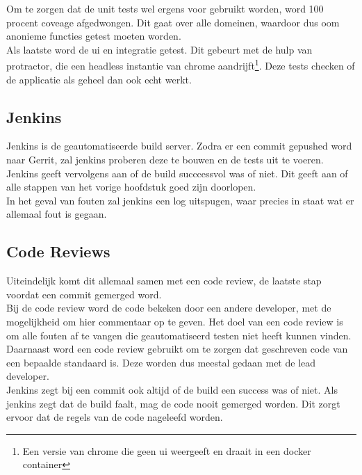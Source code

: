 Om te zorgen dat de unit tests wel ergens voor gebruikt worden, word 100 procent coveage afgedwongen. Dit gaat over alle domeinen, waardoor dus oom anonieme functies getest moeten worden. \\

Als laatste word de ui en integratie getest. Dit gebeurt met de hulp van protractor, die een headless instantie van chrome aandrijft\footnote{Een versie van chrome die geen ui weergeeft en draait in een docker container}. Deze tests checken of de applicatie als geheel dan ook echt werkt.

\subsection{Jenkins}

Jenkins is de geautomatiseerde build server. Zodra er een commit gepushed word naar Gerrit, zal jenkins proberen deze te bouwen en de tests uit te voeren. \\

Jenkins geeft vervolgens aan of de build succcessvol was of niet. Dit geeft aan of alle stappen van het vorige hoofdstuk goed zijn doorlopen. \\

In het geval van fouten zal jenkins een log uitspugen, waar precies in staat wat er allemaal fout is gegaan.

\subsection{Code Reviews}

Uiteindelijk komt dit allemaal samen met een code review, de laatste stap voordat een commit gemerged word. \\

Bij de code review word de code bekeken door een andere developer, met de mogelijkheid om hier commentaar op te geven. Het doel van een code review is om alle fouten af te vangen die geautomatiseerd testen niet heeft kunnen vinden. \\

Daarnaast word een code review gebruikt om te zorgen dat geschreven code van een bepaalde standaard is. Deze worden dus meestal gedaan met de lead developer. \\

Jenkins zegt bij een commit ook altijd of de build een success was of niet. Als jenkins zegt dat de build faalt, mag de code nooit gemerged worden. Dit zorgt ervoor dat de regels van de code nageleefd worden. \\

